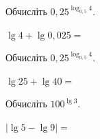\documentclass[12pt]{article}
\begin{document}
\begin{samepage}
\noindent\zadnum Обчисліть $0{,}25^{\log_{0,5} 4}$. \par
\nopagebreak\nbvspace{0.3cm}

\nmtnobreak
{}
\par{}
\end{samepage}

\begin{samepage}
\noindent\zadnum $\lg 4 + \lg 0{,}025 = $ \par
\nopagebreak\nbvspace{0.3cm}

\nmtnobreak
{}
\par{}
\end{samepage}

\begin{samepage}
\noindent\zadnum Обчисліть $0{,}25^{\log_{0,5} 4}$. \par
\nopagebreak\nbvspace{0.3cm}

\nmtnobreak
{}
\par{}
\end{samepage}

\begin{samepage}
\noindent\zadnum $\lg 25 + \lg 40 = $ \par
\nopagebreak\nbvspace{0.3cm}

\nmtnobreak
{}
\par{}
\end{samepage}

\begin{samepage}
\noindent\zadnum Обчисліть $100^{\lg 3}$. \par
\nopagebreak\nbvspace{0.3cm}

\nmtnobreak
{}
\par{}
\end{samepage}

\begin{samepage}
\noindent\zadnum $|\lg 5 - \lg 9| = $ \par
\nopagebreak\nbvspace{0.3cm}

\nmtnobreak
{}
\par{}
\end{samepage}
\end{document}
